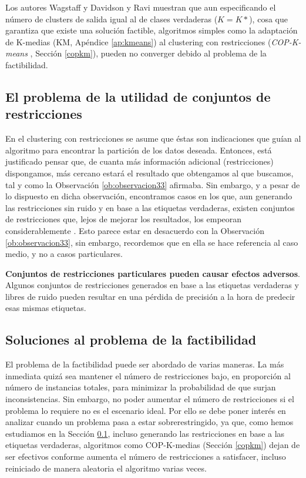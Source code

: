 Los autores Wagstaff \cite{Wagstaff:2002} y Davidson y Ravi \cite{DavidsonRavi:2007} muestran que aun especificando el número de clusters de salida igual al de clases verdaderas ($K = K*$), cosa que garantiza que existe una solución factible, algoritmos simples como la adaptación de K-medias (\acs{KM}, Apéndice \ref{ap:kmeans}) al clustering con restricciones (\textit{COP-K-means} \cite{Wagstaff:2001b}, Sección \ref{copkm}), pueden no converger debido al problema de la factibilidad.

\subsection{El problema de la utilidad de conjuntos de restricciones} \label{ProbRestr}

En el clustering con restricciones se asume que éstas son indicaciones que guían al algoritmo para encontrar la partición de los datos deseada. Entonces, está justificado pensar que, de cuanta más información adicional (restricciones) dispongamos, más cercano estará el resultado que obtengamos al que buscamos, tal y como la Observación \ref{ob:observacion33} afirmaba. Sin embargo, y a pesar de lo dispuesto en dicha observación, encontramos casos en los que, aun generando las restricciones sin ruido y en base a las etiquetas verdaderas, existen conjuntos de restricciones que, lejos de mejorar los resultados, los empeoran considerablemente \cite{DavidsonRaviWagstaff:2006}. Esto parece estar en desacuerdo con la Observación \ref{ob:observacion33}, sin embargo, recordemos que en ella se hace referencia al caso medio, y no a casos particulares.

\begin{observacion}
	
	\textbf{Conjuntos de restricciones particulares pueden causar efectos adversos}. Algunos conjuntos de restricciones generados en base a las etiquetas verdaderas y libres de ruido pueden resultar en una pérdida de precisión a la hora de predecir esas mismas etiquetas. \cite{Survey:2007}
	
\end{observacion}

\subsection{Soluciones al problema de la factibilidad} \label{problemaFactib}

El problema de la factibilidad puede ser abordado de varias maneras. La más inmediata quizá sea mantener el número de restricciones bajo, en proporción al número de instancias totales, para minimizar la probabilidad de que surjan inconsistencias. Sin embargo, no poder aumentar el número de restricciones si el problema lo requiere no es el escenario ideal. Por ello se debe poner interés en analizar cuando un problema pasa a estar sobrerestringido, ya que, como hemos estudiamos en la Sección \ref{ProbRestr}, incluso generando las restricciones en base a las etiquetas verdaderas, algoritmos como COP-K-medias (Sección \ref{copkm}) dejan de ser efectivos conforme aumenta el número de restricciones a satisfacer, incluso reiniciado de manera aleatoria el algoritmo varias veces.

